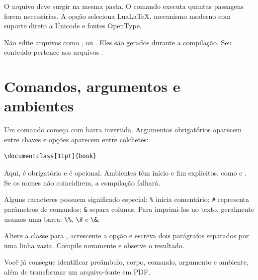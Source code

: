 O arquivo  deve surgir na mesma pasta. O comando
 executa quantas passagens forem necessárias. A opção
 seleciona LuaLaTeX, mecanismo moderno com suporte direto a
Unicode e fontes OpenType.

\begin{atencao}
  Não edite arquivos como ,  ou .
  Eles são gerados durante a compilação. Seu conteúdo pertence aos arquivos
  .
\end{atencao}

\section{Comandos, argumentos e ambientes}

Um comando começa com barra invertida. Argumentos obrigatórios aparecem entre
chaves e opções aparecem entre colchetes:

\begin{lstlisting}[language=LaTeXBook]
\documentclass[11pt]{book}
\end{lstlisting}

Aqui,  é obrigatório e \arquivo{11pt} é opcional. Ambientes têm
início e fim explícitos, como  e
. Se os nomes não coincidirem, a compilação falhará.

Alguns caracteres possuem significado especial: \verb|%| inicia comentário;
\verb|#| representa parâmetros de comandos; \verb|&| separa colunas. Para
imprimi-los no texto, geralmente usamos uma barra: \verb|\%|, \verb|\#| e
\verb|\&|.

\begin{pratica}
  Altere a classe para , acrescente a opção \arquivo{12pt} e
  escreva dois parágrafos separados por uma linha vazia. Compile novamente e
  observe o resultado.
\end{pratica}

\begin{resultado}
  Você já consegue identificar preâmbulo, corpo, comando, argumento e ambiente,
  além de transformar um arquivo-fonte em PDF.
\end{resultado}
